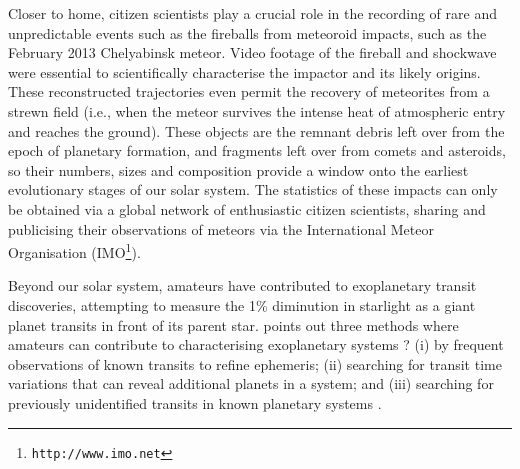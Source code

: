 \documentclass{ar2e}
\begin{document}
 Closer to home, citizen scientists play a crucial role in the
recording of rare and unpredictable events such as the fireballs from meteoroid
impacts, such as the February 2013 Chelyabinsk meteor.  Video footage of the
fireball and shockwave were essential to scientifically characterise the
impactor and its likely origins.  
These reconstructed trajectories even permit the recovery of meteorites
from a strewn field (i.e., when the meteor survives the intense heat of
atmospheric entry and reaches the ground).  These objects are the remnant debris
left over from the epoch of planetary formation, and fragments left over from
comets and asteroids, so their numbers, sizes and composition provide a window
onto the earliest evolutionary stages of our solar system.  The statistics of
these impacts can only be obtained via a global network of enthusiastic citizen
scientists, sharing and publicising their observations of meteors via the
International Meteor Organisation (IMO\footnote{\texttt{http://www.imo.net}}).



% 


 Beyond our solar system, amateurs have
contributed to exoplanetary transit discoveries,  attempting to measure the 1\%
diminution in starlight as a giant planet transits in front of its parent star.
\citet{13mousis} points out three methods where amateurs can contribute to
characterising exoplanetary systems ? (i) by frequent observations of known
transits to refine ephemeris; (ii) searching for transit time variations that
can reveal additional planets in a system; and (iii) searching for previously
unidentified transits in known planetary systems \citep[e.g., the discovery of
the transit of HD 80606b from a 30 cm telescope near London,][]{09fossey}.
\end{document}
